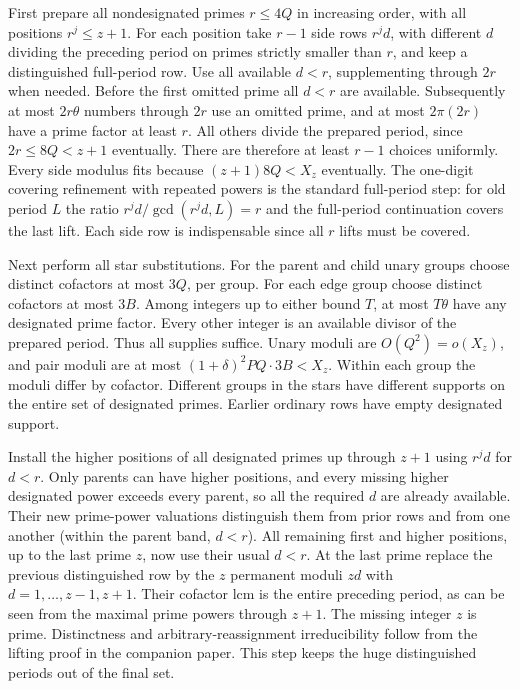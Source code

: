 \documentclass[11pt]{article}
\begin{document}
First prepare all nondesignated primes $r\le 4Q$ in increasing order, with all positions $r^j\le z+1$. For each position take $r-1$ side rows $r^j d$, with different $d$ dividing the preceding period on primes strictly smaller than $r$, and keep a distinguished full-period row. Use all available $d<r$, supplementing through $2r$ when needed. Before the first omitted prime all $d<r$ are available. Subsequently at most $2r\theta$ numbers through $2r$ use an omitted prime, and at most $2\pi(2r)$ have a prime factor at least $r$. All others divide the prepared period, since $2r\le8Q<z+1$ eventually. There are therefore at least $r-1$ choices uniformly. Every side modulus fits because $(z+1)8Q<X_z$ eventually. The one-digit covering refinement with repeated powers is the standard full-period step: for old period $L$ the ratio $r^jd/\gcd(r^jd,L)=r$ and the full-period continuation covers the last lift. Each side row is indispensable since all $r$ lifts must be covered.

Next perform all star substitutions. For the parent and child unary groups choose distinct cofactors at most $3Q$, per group. For each edge group choose distinct cofactors at most $3B$. Among integers up to either bound $T$, at most $T\theta$ have any designated prime factor. Every other integer is an available divisor of the prepared period. Thus all supplies suffice. Unary moduli are $O(Q^2)=o(X_z)$, and pair moduli are at most $(1+\delta)^2PQ\cdot3B<X_z$. Within each group the moduli differ by cofactor. Different groups in the stars have different supports on the entire set of designated primes. Earlier ordinary rows have empty designated support.

Install the higher positions of all designated primes up through $z+1$ using $r^j d$ for $d<r$. Only parents can have higher positions, and every missing higher designated power exceeds every parent, so all the required $d$ are already available. Their new prime-power valuations distinguish them from prior rows and from one another (within the parent band, $d<r$). All remaining first and higher positions, up to the last prime $z$, now use their usual $d<r$. At the last prime replace the previous distinguished row by the $z$ permanent moduli $zd$ with $d=1,\ldots,z-1,z+1$. Their cofactor lcm is the entire preceding period, as can be seen from the maximal prime powers through $z+1$. The missing integer $z$ is prime. Distinctness and arbitrary-reassignment irreducibility follow from the lifting proof in the companion paper. This step keeps the huge distinguished periods out of the final set.
\end{document}
